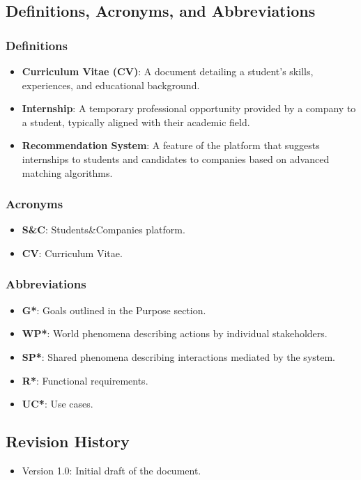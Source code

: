\documentclass[12pt]{article}
\begin{document}
\subsection{Definitions, Acronyms, and Abbreviations}
\subsubsection{Definitions}
\begin{itemize}
    \item \textbf{Curriculum Vitae (CV)}: A document detailing a student's skills, experiences, and educational background.
    \item \textbf{Internship}: A temporary professional opportunity provided by a company to a student, typically aligned with their academic field.
    \item \textbf{Recommendation System}: A feature of the platform that suggests internships to students and candidates to companies based on advanced matching algorithms.
\end{itemize}

\subsubsection{Acronyms}
\begin{itemize}
    \item \textbf{S\&C}: Students\&Companies platform.
    \item \textbf{CV}: Curriculum Vitae.
\end{itemize}

\subsubsection{Abbreviations}
\begin{itemize}
    \item \textbf{G*}: Goals outlined in the Purpose section.
    \item \textbf{WP*}: World phenomena describing actions by individual stakeholders.
    \item \textbf{SP*}: Shared phenomena describing interactions mediated by the system.
    \item \textbf{R*}: Functional requirements.
    \item \textbf{UC*}: Use cases.
\end{itemize}

\subsection{Revision History}
\begin{itemize}
    \item Version 1.0: Initial draft of the document.
\end{itemize}
\end{document}
